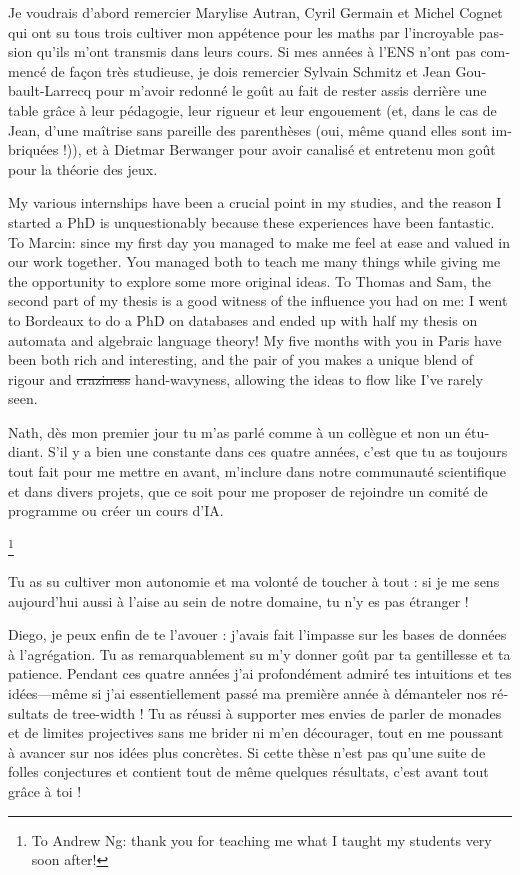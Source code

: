 \begin{french}
Je voudrais d'abord remercier Marylise Autran, Cyril Germain et Michel Cognet qui ont su tous trois 
cultiver mon appétence pour les maths par l'incroyable passion qu'ils m'ont transmis dans leurs 
cours. Si mes années à l'ENS n'ont pas commencé de façon très studieuse, je dois remercier
Sylvain Schmitz et Jean Goubault-Larrecq pour m'avoir redonné le goût au fait de rester assis derrière une table grâce à leur pédagogie, leur rigueur et leur engouement (et, dans le cas de Jean, d'une maîtrise sans pareille des parenthèses (oui, même quand elles sont imbriquées !)),
et à Dietmar Berwanger pour avoir canalisé et entretenu mon goût pour la théorie des jeux.
\end{french}

My various internships have been a crucial point in my studies, and the reason I started a PhD
is unquestionably because these experiences have been fantastic. To Marcin: since my 
first day you managed to make me feel at ease and valued in our work together. You managed 
both to teach me many things while giving me the opportunity to explore some more original ideas.
To Thomas and Sam, the second part of my thesis is a good witness of the 
influence you had on me: I went to Bordeaux to do a PhD on databases and ended up with half my 
thesis on automata and algebraic language theory! My five months with you in Paris have been both
rich and interesting, and the pair of you makes a unique blend of rigour and \sout{craziness} 
hand-wavyness, allowing the ideas to flow like I've rarely seen.

\begin{french}
Nath, dès mon premier jour tu m'as parlé comme à un collègue et non un étudiant. S'il y a
bien une constante dans ces quatre années, c'est que tu as toujours tout fait pour me mettre en 
avant, m'inclure dans notre communauté scientifique et dans divers projets, que ce soit pour
me proposer de rejoindre un comité de programme ou créer un cours d'IA.%
\end{french}%
\footnote{To Andrew Ng: thank you for teaching me what I taught my students very soon after!}
\begin{french}
Tu as su cultiver mon autonomie et ma volonté de toucher à tout : si je me sens aujourd'hui aussi
à l'aise au sein de notre domaine, tu n'y es pas étranger !

Diego, je peux enfin de te l'avouer : j'avais fait l'impasse sur les bases de données
à l'agrégation. Tu as remarquablement su m'y donner goût par ta gentillesse et ta patience.
Pendant ces quatre années j'ai profondément admiré tes intuitions et tes idées---même si j'ai essentiellement passé ma première année à démanteler nos résultats de tree-width !
Tu as réussi à supporter mes envies de parler de monades et de limites projectives
sans me brider ni m'en décourager, tout en me poussant à avancer sur nos idées plus concrètes.
Si cette thèse n'est pas qu'une suite de folles conjectures et contient tout de même quelques résultats, c'est avant tout grâce à toi !
\end{french}

